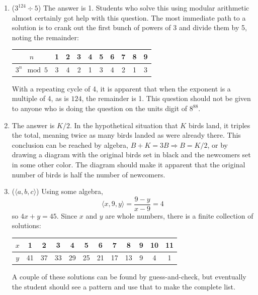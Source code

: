 {\begin{enumerate}
		\item ($3^{124}\div 5$) The answer is 1. Students who solve this using modular arithmetic almost certainly got help with this question. The most immediate path to a solution is to crank out the first bunch of powers of 3 and divide them by 5, noting the remainder:
		\begin{center}
			\begin{tabular}{|c|c|c|c|c|c|c|c|c|c|}
				\hline
				$n$				& 1 & 2 & 3 & 4 & 5 & 6 & 7 & 8 & 9 \tabularnewline
				\hline
				$3^n \mod 5$ 	& 3 & 4 & 2 & 1 & 3 & 4 & 2 & 1 & 3\tabularnewline
				\hline
			\end{tabular}\par
		\end{center}
		With a repeating cycle of 4, it is apparent that when the exponent is a multiple of 4, as is $124$, the remainder is 1. This question should not be given to anyone who is doing the question on the units digit of $8^{88}$.
		
		\item The answer is $K/2$. In the hypothetical situation that $K$ birds land, it triples the total, meaning twice as many birds landed as were already there. This conclusion can be reached by algebra, $B+K=3B\Rightarrow B=K/2$, or by drawing a diagram with the original birds set in black and the newcomers set in some other color. The diagram should make it apparent that the original number of birds is half the number of newcomers.
		
		\item ($\langle a,b,c\rangle$) Using some algebra,
		$$\langle x,9,y\rangle = \frac{9-y}{x-9}=4$$
		so $4x+y=45$. Since $x$ and $y$ are whole numbers, there is a finite collection of solutions:
		\begin{center}
			\begin{tabular}{|c|c|c|c|c|c|c|c|c|c|c|c|}
				\hline
				$x$		&  1 &  2 &  3 &  4 &  5 &  6 &  7 &  8 & 9 & 10 & 11 \tabularnewline
				\hline
				$y$ 	& 41 & 37 & 33 & 29 & 25 & 21 & 17 & 13 & 9 &  4 & 1  \tabularnewline
				\hline
			\end{tabular}\par
		\end{center}
		A couple of these solutions can be found by guess-and-check, but eventually the student should see a pattern and use that to make the complete list.
		

\end{enumerate}}
